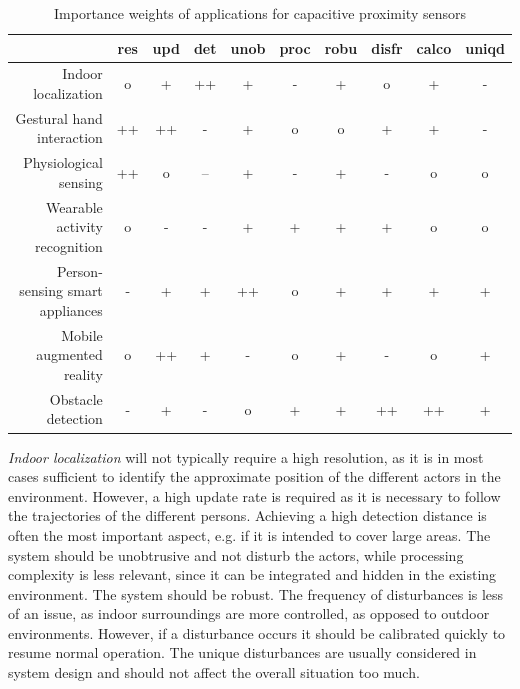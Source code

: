 \begin{table}[htbp]
  \centering
  \caption{Importance weights of applications for capacitive proximity sensors}
       \begin{tabular}{rccccccccc}
    \toprule
          & res   & upd   & det   & unob  & proc  & robu  & disfr & calco & uniqd \\
    \midrule
        Indoor localization & o     & +     & ++    & +     & -     & +     & o     & +     & - \\
    Gestural hand interaction & ++    & ++    & -     & +     & o     & o     & +     & +     & - \\
    Physiological sensing & ++    & o     & --    & +     & -     & +     & -     & o     & o \\
    Wearable activity recognition & o     & -     & -     & +     & +     & +     & +     & o     & o \\
    Person-sensing smart appliances & -     & +     & +     & ++    & o     & +     & +     & +     & + \\
    Mobile augmented reality & o     & ++    & +     & -     & o     & +     & -     & o     & + \\
    Obstacle detection & -     & +     & -     & o     & +     & +     & ++    & ++    & + \\

    \bottomrule
    \end{tabular}%
  \label{tab:bench_cap_apps}%
\end{table}%

\emph{Indoor localization} will not typically require a high resolution, as it is in most cases sufficient to identify the approximate position of the different actors in the environment. However, a high update rate is required as it is necessary to follow the trajectories of the different persons. Achieving a high detection distance is often the most important aspect, e.g. if it is intended to cover large areas. The system should be unobtrusive and not disturb the actors, while processing complexity is less relevant, since it can be integrated and hidden in the existing environment. The system should be robust. The frequency of disturbances is less of an issue, as indoor surroundings are more controlled, as opposed to outdoor environments. However, if a disturbance occurs it should be calibrated quickly to resume normal operation. The unique disturbances are usually considered in system design and should not affect the overall situation too much.

